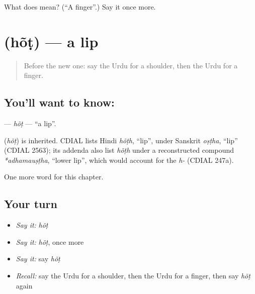 \begin{tcolorbox}[breakable,colback=teal!4,colframe=teal!35!black,title={Before you move on}]
What does  mean? (\textquotedblleft{}A finger\textquotedblright{}.) Say it once more.
\end{tcolorbox}
\section[\texorpdfstring{\ur{ہونٹ} (hõṭ)}{ہونٹ (hõṭ)}]{ (hõṭ) — a lip}

\label{lesson:UR-C39-hot}



\begin{quote}
Before the new one: say the Urdu for a shoulder, then the Urdu for a finger.
\end{quote}

\subsection*{You'll want to know: }
\textbf{} — \emph{hõṭ} — \textquotedblleft{}a lip\textquotedblright{}.

\begin{cousinweb}
\textbf{} (\emph{hõṭ}) is inherited. CDIAL lists Hindi \emph{hõṭh}, \textquotedblleft{}lip\textquotedblright{}, under Sanskrit \emph{oṣṭha}, \textquotedblleft{}lip\textquotedblright{} (CDIAL 2563); its addenda also list \emph{hõṭh} under a reconstructed compound \emph{*adhamauṣṭha}, \textquotedblleft{}lower lip\textquotedblright{}, which would account for the \emph{h-} (CDIAL 247a).
\end{cousinweb}

\begin{grammarlens}[title={What you've built}]
One more word for this chapter.
\end{grammarlens}

\subsection*{Your turn}
\begin{itemize}
\raggedright
  \item \emph{Say it:} \emph{hõṭ}
  \item \emph{Say it:} \emph{hõṭ}, once more
  \item \emph{Say it:} say \emph{hõṭ}
  \item \emph{Recall:} say the Urdu for a shoulder, then the Urdu for a finger, then say \emph{hõṭ} again
\end{itemize}


